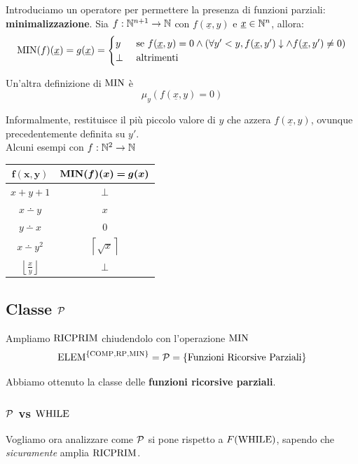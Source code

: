 Introduciamo un operatore per permettere la presenza di funzioni parziali: \textbf{minimalizzazione}. Sia $f: \mathbb{N}^{n+1} \rightarrow \mathbb{N}$ con $f(\underline{x}, y)$ e $\underline{x} \in \mathbb{N}^n$, allora: 
$$
\operatorname{MIN} (f) (\underline{x}) = g(\underline{x}) = \begin{cases}
	y & \text{ se } f(\underline{x}, y) = 0 \wedge (\forall y' < y, f(\underline{x}, y') \downarrow \wedge f(\underline{x}, y') \neq 0) \\
	\bot & \text{ altrimenti}
\end{cases}
$$

Un'altra definizione di $\operatorname{MIN}$ è 
$$ \mu_y (f(\underline{x}, y) = 0)$$

Informalmente, restituisce il più piccolo valore di $y$ che azzera $f(\underline{x},y)$, ovunque precedentemente definita su $y'$.\\

Alcuni esempi con $f: \mathbb{N}^2 \rightarrow \mathbb{N}$
\begin{center}
	\begin{tabular}{c|c}
		$\bm{f(x,y)}$ & $\bm{\MIN(f)(x)=g(x)}$ \\ 
		\hline
		$x+y+1$ & $\bot$\\
		$x \dotminus y$ & $x$\\
		$y \dotminus x$ & $0$\\
		$x \dotminus y^2$ & $\left\lceil\sqrt{x}\right\rceil$\\
		$\left\lfloor\frac{x}{y}\right\rfloor$ & $\bot$\\
	\end{tabular}
\end{center}

\subsection{Classe $\mathcal{P}$}
Ampliamo $\text{RICPRIM}$ chiudendolo con l'operazione $\operatorname{MIN}$
$$ \text{ELEM}^{\{\text{COMP}, \text{RP}, \operatorname{MIN}\}} = \mathcal{P} = \{\text{Funzioni Ricorsive Parziali}\}$$

Abbiamo ottenuto la classe delle \textbf{funzioni ricorsive parziali}.\\

\subsubsection{$\mathcal{P}$ vs $\text{WHILE}$}

Vogliamo ora analizzare come $\mathcal{P}$ si pone rispetto a $F(\text{WHILE})$, sapendo che \textit{sicuramente} amplia $\text{RICPRIM}$.\\

